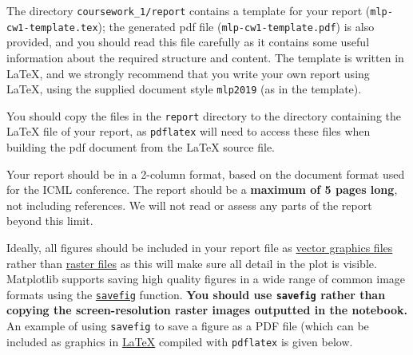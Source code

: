 \documentclass[11pt,]{article}
\begin{document}
The directory \verb+coursework_1/report+ contains a template for your report (\verb+mlp-cw1-template.tex+);  the generated pdf file (\verb+mlp-cw1-template.pdf+) is also provided, and you should read this file carefully as it contains some useful information about the required structure and content. The template is written in LaTeX, and we strongly recommend that you write your own report using LaTeX, using the supplied document style \verb+mlp2019+ (as in the template).

You should copy the files in the \verb+report+ directory to the directory containing the LaTeX file of your report, as \verb+pdflatex+ will need to access these files when building the pdf document from the LaTeX source file.

Your report should be in a 2-column format, based on the document format used for the ICML conference. The report should be a \textbf{maximum of 5 pages long}, not including references.  We will not read or assess any parts of the report beyond this limit.

Ideally, all figures should be included in your report file as
\href{https://en.wikipedia.org/wiki/Vector_graphics}{vector graphics files}
rather than \href{https://en.wikipedia.org/wiki/Raster_graphics}{raster
files} as this will make sure all detail in the plot is visible.
Matplotlib supports saving high quality figures in a wide range of
common image formats using the
\href{http://matplotlib.org/api/pyplot_api.html\#matplotlib.pyplot.savefig}{\texttt{savefig}}
function. \textbf{You should use \texttt{savefig} rather than copying
the screen-resolution raster images outputted in the notebook.} An
example of using \texttt{savefig} to save a figure as a PDF file (which
can be included as graphics in
\href{https://en.wikibooks.org/wiki/LaTeX/Importing_Graphics}{LaTeX}
compiled with \texttt{pdflatex} 
is given below.
\end{document}
